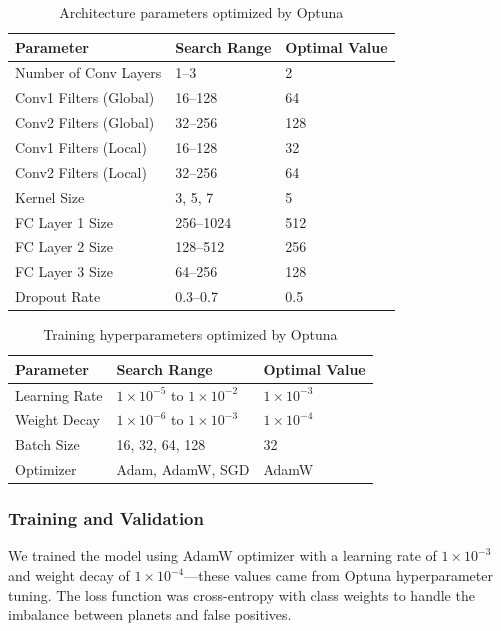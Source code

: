 \documentclass[letterpaper]{article} %
\begin{document}
\begin{table}[H]
\centering
\caption{Architecture parameters optimized by Optuna}
\label{tab:architecture_params}
\begin{tabular}{lll}
\hline
\textbf{Parameter} & \textbf{Search Range} & \textbf{Optimal Value} \\
\hline
Number of Conv Layers & 1--3 & 2 \\
Conv1 Filters (Global) & 16--128 & 64 \\
Conv2 Filters (Global) & 32--256 & 128 \\
Conv1 Filters (Local) & 16--128 & 32 \\
Conv2 Filters (Local) & 32--256 & 64 \\
Kernel Size & 3, 5, 7 & 5 \\
FC Layer 1 Size & 256--1024 & 512 \\
FC Layer 2 Size & 128--512 & 256 \\
FC Layer 3 Size & 64--256 & 128 \\
Dropout Rate & 0.3--0.7 & 0.5 \\
\hline
\end{tabular}
\end{table}

\begin{table}[H]
\centering
\caption{Training hyperparameters optimized by Optuna}
\label{tab:training_params}
\begin{tabular}{lll}
\hline
\textbf{Parameter} & \textbf{Search Range} & \textbf{Optimal Value} \\
\hline
Learning Rate & $1\times10^{-5}$ to $1\times10^{-2}$ & $1\times10^{-3}$ \\
Weight Decay & $1\times10^{-6}$ to $1\times10^{-3}$ & $1\times10^{-4}$ \\
Batch Size & 16, 32, 64, 128 & 32 \\
Optimizer & Adam, AdamW, SGD & AdamW \\
\hline
\end{tabular}
\end{table}

\subsubsection{Training and Validation}
We trained the model using AdamW optimizer with a learning rate of $1\times10^{-3}$ and weight decay of $1\times10^{-4}$—these values came from Optuna hyperparameter tuning. The loss function was cross-entropy with class weights to handle the imbalance between planets and false positives. 
\end{document}
